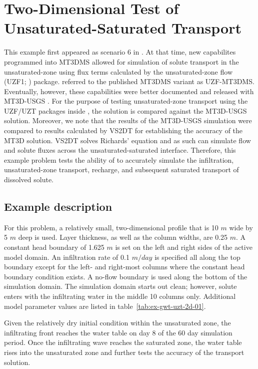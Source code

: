 \section{Two-Dimensional Test of Unsaturated-Saturated Transport}

This example first appeared as scenario 6 in \cite{morway2013}.  At that time, new capabilites programmed into MT3DMS \citep{zheng1999mt3dms} allowed for simulation of solute transport in the unsaturated-zone using flux terms calculated by the unsaturated-zone flow (UZF1; \cite{UZF}) package. \cite{morway2013} referred to the published MT3DMS variant as UZF-MT3DMS. Eventually, however, these capabilities were better documented and released with MT3D-USGS \citep{mt3dusgs}. For the purpose of testing unsaturated-zone transport using the UZF/UZT packages inside \mf, the \mf solution is compared against the MT3D-USGS solution. Moreover, we note that the results of the  MT3D-USGS simulation were compared to results calculated by VS2DT \citep{lappalaetal1987VS2D} for establishing the accuracy of the MT3D solution.  VS2DT solves Richards' equation and as such can simulate flow and solute fluxes across the unsaturated-saturated interface.  Therefore, this example problem tests the ability of \mf to accurately simulate the infiltration, unsaturated-zone transport, recharge, and subsequent saturated transport of dissolved solute.

\subsection{Example description}

For this problem, a relatively small, two-dimensional profile that is 10 $m$ wide by 5 $m$ deep is used.  Layer thickness, as well as the column widths, are 0.25 $m$. A constant head boundary of 1.625 $m$ is set on the left and right sides of the active model domain.  An infiltration rate of 0.1 $m/day$ is specified all along the top boundary except for the left- and right-most columns where the constant head boundary condition exists.  A no-flow boundary is used along the bottom of the simulation domain.  The simulation domain starts out clean; however, solute enters with the infiltrating water in the middle 10 columns only.  Additional model parameter values are listed in table~\ref{tab:ex-gwt-uzt-2d-01}.  



Given the relatively dry initial condition within the unsaturated zone, the infiltrating front reaches the water table on day 8 of the 60 day simulation period. Once the infiltrating wave reaches the saturated zone, the water table rises into the unsaturated zone and further tests the accuracy of the transport solution.

